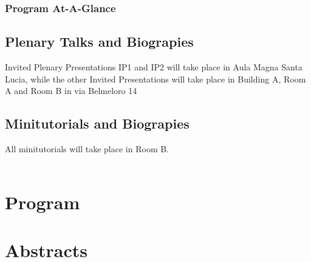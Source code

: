 \documentclass[twoside]{book}
\begin{document}

%

%
%

\usechapterimagetrue
{} %
\pagestyle{empty} %

\tableofcontents %
\cleardoublepage %
\pagestyle{fancy} %

\newpage
\section*{Program At-A-Glance}




\chapter*{Plenary Talks and Biograpies}

{\Large{Invited Plenary Presentations  IP1 and IP2 will take place in Aula Magna Santa Lucia, while the other Invited Presentations will take place in Building A, Room A and Room B in via Belmeloro 14}}



\chapter*{Minitutorials and Biograpies}

{\Large{All minitutorials will take place in Room B.}}\\\\



\part{Program}



\part{Abstracts}
\end{document}
